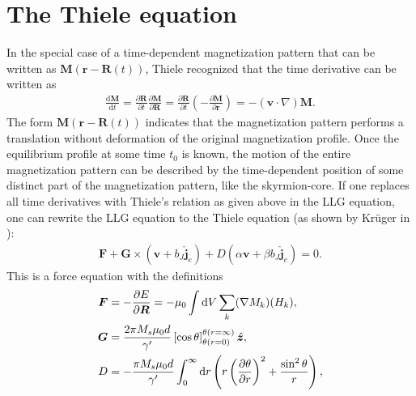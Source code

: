 \section{The Thiele equation}
In the special case of a time-dependent magnetization pattern that can be written as $\mathbold{M}(\mathbold{r}-\mathbold{R}(t))$, Thiele recognized \cite{Thiele1973} that the time derivative can be written as 
\begin{align}
\label{eq:ThieleRelation}
\frac{\textrm{d} \mathbold{M}}{\textrm{d} t} = \frac{\partial \mathbold{R}}{\partial t}\frac{\partial \mathbold{M}}{\partial \mathbold{R}} = \frac{\partial \mathbold{R}}{\partial t} (-\frac{\partial \mathbold{M}}{\partial \mathbold{r}}) = -(\mathbold{v}\cdot\nabla)\mathbold{M}.
\end{align}
The form $\mathbold{M}(\mathbold{r}-\mathbold{R}(t))$ indicates that the magnetization pattern performs a translation without deformation of the original magnetization profile. Once the equilibrium profile at some time $t_0$ is known, the motion of the entire magnetization pattern can be described by the time-dependent position of some distinct part of the magnetization pattern, like the skyrmion-core. If one replaces all time derivatives with Thiele's relation as given above in the LLG equation, one can rewrite the LLG equation to the Thiele equation (as shown by Kr\"{u}ger in \cite{krugerDissertation}):
\begin{align}
\label{eq:Thiele}
\mathbold{F} + \mathbold{G}\times(\mathbold{v}+b_J\mathbold{\hat{j}}_e) + D(\alpha\mathbold{v}+\beta b_J\mathbold{\hat{j}}_e) = 0.
\end{align}
This is a force equation with the definitions
\begin{subequations}
\label{eq:ThieleFGD}
\begin{align}
\label{eq:ThieleF}
\mathbold{F} &= -\frac{\partial E}{\partial \mathbold{R}} = -\mu_0\int \d V\sum_k (\mathbold{\nabla}M_k)(H_k), \\
\label{eq:ThieleG}
\mathbold{G} &= \frac{2\pi M_s\mu_0 d}{\gamma'}\left[\cos\theta\right]_{\theta(r=0)}^{\theta(r=\infty)} \mathbold{\hat{z}},\\
\label{eq:ThieleD}
D &= - \frac{\pi M_s \mu_0 d}{\gamma '} \int_0^{\infty} \d r \left(r\left(\frac{\partial \theta}{\partial r}\right)^2+\frac{\sin^2\theta}{r}\right),
\end{align}
\end{subequations}

